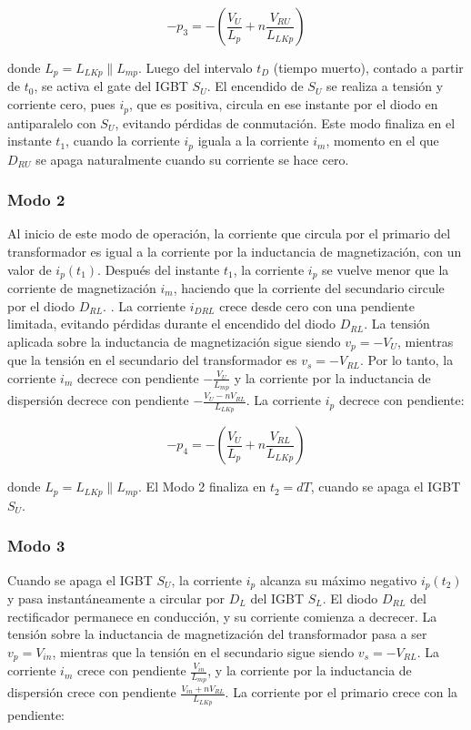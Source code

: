 \[
-p_3 = -\left( \frac{V_U}{L_p} + n \frac{V_{RU}}{L_{LKp}} \right)
\]

donde \( L_p = L_{LKp} \parallel L_{mp} \). Luego del intervalo \( t_D \) (tiempo muerto), contado a partir de \( t_0 \), se activa el gate del IGBT \( S_U \). El encendido de \( S_U \) se realiza a tensión y corriente cero, pues \( i_p \), que es positiva, circula en ese instante por el diodo en antiparalelo con \( S_U \), evitando pérdidas de conmutación. Este modo finaliza en el instante \( t_1 \), cuando la corriente \( i_p \) iguala a la corriente \( i_m \), momento en el que \( D_{RU} \) se apaga naturalmente cuando su corriente se hace cero.

\subsubsection{Modo 2}

Al inicio de este modo de operación, la corriente que circula por el primario del transformador es igual a la corriente por la inductancia de magnetización, con un valor de \( i_p(t_1) \). Después del instante \( t_1 \), la corriente \( i_p \) se vuelve menor que la corriente de magnetización \( i_m \), haciendo que la corriente del secundario circule por el diodo \( D_{RL} \). . La corriente \( i_{DRL} \) crece desde cero con una pendiente limitada, evitando pérdidas durante el encendido del diodo \( D_{RL} \). La tensión aplicada sobre la inductancia de magnetización sigue siendo \( v_p = -V_U \), mientras que la tensión en el secundario del transformador es \( v_s = -V_{RL} \). Por lo tanto, la corriente \( i_m \) decrece con pendiente \( -\frac{V_U}{L_{mp}} \) y la corriente por la inductancia de dispersión decrece con pendiente \( -\frac{V_U - nV_{RL}}{L_{LKp}} \). La corriente \( i_p \) decrece con pendiente:

\[
-p_4 = -\left( \frac{V_U}{L_p} + n \frac{V_{RL}}{L_{LKp}} \right)
\]

donde \( L_p = L_{LKp} \parallel L_{mp} \). El Modo 2 finaliza en \( t_2 = dT \), cuando se apaga el IGBT \( S_U \).

\subsubsection{Modo 3}

Cuando se apaga el IGBT \( S_U \), la corriente \( i_p \) alcanza su máximo negativo \( i_p(t_2) \) y pasa instantáneamente a circular por \( D_L \) del IGBT \( S_L \). El diodo \( D_{RL} \) del rectificador permanece en conducción, y su corriente comienza a decrecer. La tensión sobre la inductancia de magnetización del transformador pasa a ser \( v_p = V_{in} \), mientras que la tensión en el secundario sigue siendo \( v_s = -V_{RL} \). La corriente \( i_m \) crece con pendiente \( \frac{V_{in}}{L_{mp}} \), y la corriente por la inductancia de dispersión crece con pendiente \( \frac{V_{in} + nV_{RL}}{L_{LKp}} \). La corriente por el primario crece con la pendiente:

